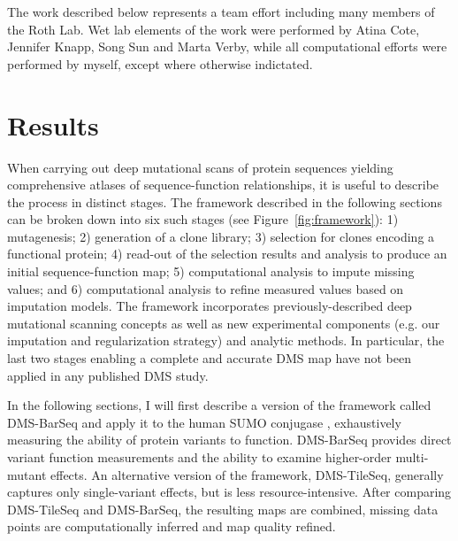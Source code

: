 The work described below represents a team effort including many members of the Roth Lab. Wet lab elements of the work were performed by Atina Cote, Jennifer Knapp, Song Sun and Marta Verby, while all computational efforts were performed by myself, except where otherwise indictated.


\section{Results}

When carrying out deep mutational scans of protein sequences yielding comprehensive atlases of sequence-function relationships, it is useful to describe the process in distinct stages. The framework described in the following sections can be broken down into six such stages (see Figure~\ref{fig:framework}): 1) mutagenesis; 2) generation of a clone library; 3) selection for clones encoding a functional protein; 4) read-out of the selection results and analysis to produce an initial sequence-function map; 5) computational analysis to impute missing values; and 6) computational analysis to refine measured values based on imputation models. The framework incorporates previously-described deep mutational scanning concepts as well as new experimental components (e.g. our imputation and regularization strategy) and analytic methods. In particular, the last two stages enabling a complete and accurate DMS map have not been applied in any published DMS study.

In the following sections, I will first describe a version of the framework called DMS-BarSeq and apply it to the human SUMO conjugase , exhaustively measuring the ability of protein variants to function. DMS-BarSeq provides direct variant function measurements and the ability to examine higher-order multi-mutant effects. An alternative version of the framework, DMS-TileSeq, generally captures only single-variant effects, but is less resource-intensive. After comparing DMS-TileSeq and DMS-BarSeq, the resulting maps are combined, missing data points are computationally inferred and map quality refined.



